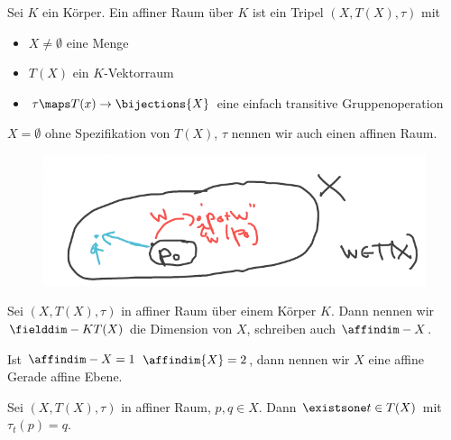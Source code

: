 \begin{definition*}
    Sei \( K \) ein Körper. 
    Ein affiner Raum über \( K \) ist ein Tripel \( (X, T(X), \tau ) \) mit
    \begin{itemize}
        \item \( X\neq \emptyset \) eine Menge 
        \item \( T(X) \) ein \( K \)-Vektorraum 
        \item \( \tau\maps T(x)\to \bijections{X} \) eine einfach transitive Gruppenoperation
    \end{itemize}
\end{definition*}
\begin{konvention*}
    \( X=\emptyset \) ohne Spezifikation von \( T(X) \), \( \tau \) nennen wir auch einen affinen Raum.
\end{konvention*}
\begin{figure}[H]
    \centering
    \includegraphics[width=0.5\linewidth]{figures/affiner_raum}
    \label{fig:affiner_raum}
\end{figure}
\begin{definition*}
    Sei \( (X,T(X),\tau) \) in affiner Raum über einem Körper \( K \). 
    Dann nennen wir \( \fielddim-{K}{T(X)} \) die Dimension von \( X \), schreiben auch \( \affindim-{X} \).
     
    Ist \( \affindim-{X}=1 \) \bzw \( \affindim{X}=2 \), dann nennen wir \( X \) eine affine Gerade \bzw affine Ebene.
\end{definition*}

Sei \( (X, T(X), \tau) \) in affiner Raum, \( p,q\in X \). Dann \( \existsone t\in T(X) \) mit \( \tau_t(p)=q \).

